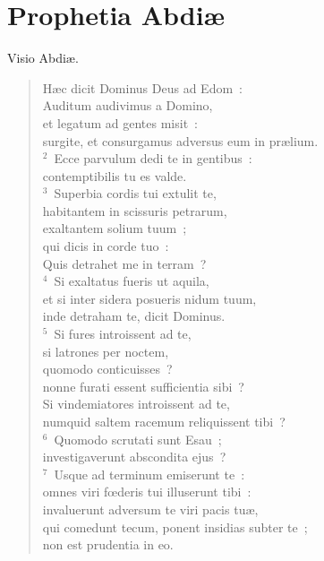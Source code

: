 \clearpage
{\centering \section*{Prophetia Abdiæ}}\thispagestyle{empty}

\noindent Visio Abdi\ae . \begin{flushleft}\begin{verse}\vspace{6pt}H\ae c dicit Dominus Deus ad Edom~:\\ Auditum audivimus a Domino,\\ et legatum ad gentes misit~:\\ surgite, et consurgamus adversus eum in pr\ae lium.\\
${}^{2}$~Ecce parvulum dedi te in gentibus~:\\ contemptibilis tu es valde.\\
${}^{3}$~Superbia cordis tui extulit te,\\ habitantem in scissuris petrarum,\\ exaltantem solium tuum~;\\ qui dicis in corde tuo~:\\ Quis detrahet me in terram~?\\
${}^{4}$~Si exaltatus fueris ut aquila,\\ et si inter sidera posueris nidum tuum,\\ inde detraham te, dicit Dominus.\\
${}^{5}$~Si fures introissent ad te,\\ si latrones per noctem,\\ quomodo conticuisses~?\\ nonne furati essent sufficientia sibi~?\\ Si vindemiatores introissent ad te,\\ numquid saltem racemum reliquissent tibi~?\\
${}^{6}$~Quomodo scrutati sunt Esau~;\\ investigaverunt abscondita ejus~?\\
${}^{7}$~Usque ad terminum emiserunt te~:\\ omnes viri fœderis tui illuserunt tibi~:\\ invaluerunt adversum te viri pacis tu\ae ,\\ qui comedunt tecum, ponent insidias subter te~;\\ non est prudentia in eo.\\

\end{verse}
\end{flushleft}
